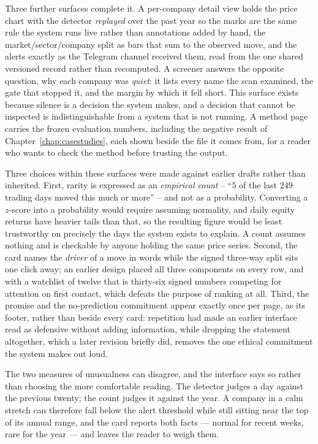 Three further surfaces complete it. A per-company detail view holds the price chart with the
detector \emph{replayed} over the past year so the marks are the same rule the system runs live
rather than annotations added by hand, the market/sector/company split as bars that sum to the
observed move, and the alerts exactly as the Telegram channel received them, read from the one
shared versioned record rather than recomputed. A screener answers the opposite question, why each
company was \emph{quiet}: it lists every name the scan examined, the gate that stopped it, and the
margin by which it fell short. This surface exists because silence is a decision the system makes,
and a decision that cannot be inspected is indistinguishable from a system that is not running. A
method page carries the frozen evaluation numbers, including the negative result of
Chapter~\ref{chap:casestudies}, each shown beside the file it comes from, for a reader who wants to
check the method before trusting the output.

Three choices within these surfaces were made against earlier drafts rather than inherited. First,
rarity is expressed as an \emph{empirical count} -- ``$5$ of the last $249$ trading days moved this
much or more'' -- and not as a probability. Converting a $z$-score into a probability would require
assuming normality, and daily equity returns have heavier tails than that, so the resulting figure
would be least trustworthy on precisely the days the system exists to explain. A count assumes
nothing and is checkable by anyone holding the same price series. Second, the card names the
\emph{driver} of a move in words while the signed three-way split sits one click away; an earlier
design placed all three components on every row, and with a watchlist of twelve that is thirty-six
signed numbers competing for attention on first contact, which defeats the purpose of ranking at
all. Third, the promise and the no-prediction commitment appear exactly once per page, as its
footer, rather than beside every card: repetition had made an earlier interface read as defensive
without adding information, while dropping the statement altogether, which a later revision briefly
did, removes the one ethical commitment the system makes out loud.

The two measures of unusualness can disagree, and the interface says so rather than choosing the
more comfortable reading. The detector judges a day against the previous twenty; the count judges it
against the year. A company in a calm stretch can therefore fall below the alert threshold while
still sitting near the top of its annual range, and the card reports both facts --- normal for recent
weeks, rare for the year --- and leaves the reader to weigh them.

